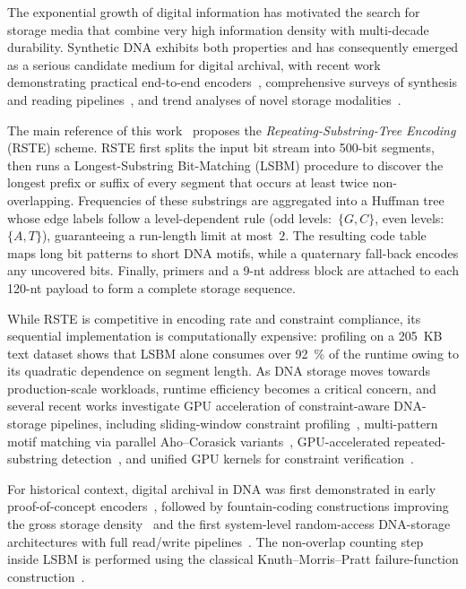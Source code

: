 \documentclass[runningheads]{llncs}
\begin{document}
The exponential growth of digital information has motivated the search
for storage media that combine very high information density with
multi-decade durability.  Synthetic DNA exhibits both properties and
has consequently emerged as a serious candidate medium for digital
archival, with recent work demonstrating practical end-to-end
encoders~\cite{ref_welzel2023,ref_ping2022}, comprehensive surveys of
synthesis and reading
pipelines~\cite{ref_doricchi2022,ref_meiser2022}, and trend analyses
of novel storage modalities~\cite{ref_lim2021}.

The main reference of this work~\cite{ref_rste} proposes the
\emph{Repeating-Substring-Tree Encoding} (RSTE) scheme.  RSTE first
splits the input bit stream into 500-bit segments, then runs a
Longest-Substring Bit-Matching (LSBM) procedure to discover the longest
prefix or suffix of every segment that occurs at least twice
non-overlapping.  Frequencies of these substrings are aggregated into a
Huffman tree whose edge labels follow a level-dependent rule
(odd levels:~$\{G, C\}$, even levels:~$\{A, T\}$), guaranteeing a
run-length limit at most~$2$.  The resulting code table maps long bit
patterns to short DNA motifs, while a quaternary fall-back encodes any
uncovered bits.  Finally, primers and a 9-nt address block are attached
to each 120-nt payload to form a complete storage sequence.

While RSTE is competitive in encoding rate and constraint compliance,
its sequential implementation is computationally expensive: profiling
on a 205~KB text dataset shows that LSBM alone consumes over 92~\% of
the runtime owing to its quadratic dependence on segment length.  As
DNA storage moves towards production-scale workloads, runtime
efficiency becomes a critical concern, and several recent works
investigate GPU acceleration of constraint-aware DNA-storage
pipelines, including sliding-window constraint
profiling~\cite{ref_gpu_dnastorage}, multi-pattern motif matching via
parallel Aho--Corasick variants~\cite{ref_pfac_gpu}, GPU-accelerated
repeated-substring detection~\cite{ref_lsbm_gpu}, and unified GPU
kernels for constraint verification~\cite{ref_unified_gpu}.

For historical context, digital archival in DNA was first demonstrated
in early proof-of-concept
encoders~\cite{ref_church2012,ref_goldman2013}, followed by
fountain-coding constructions improving the gross storage
density~\cite{ref_erlich2017} and the first system-level random-access
DNA-storage architectures with full read/write
pipelines~\cite{ref_bornholt2016,ref_organick2018}.  The non-overlap
counting step inside LSBM is performed using the classical
Knuth--Morris--Pratt failure-function
construction~\cite{ref_kmp1977}.
\end{document}

